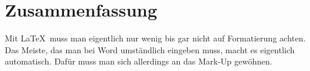 \begingroup
\color{blue}
\chapter{Zusammenfassung}
Mit \LaTeX\ muss man eigentlich nur wenig bis gar nicht auf Formatierung achten.
Das Meiste, das man bei Word umständlich eingeben muss, macht es eigentlich
automatisch. Dafür muss man sich allerdings an das Mark-Up gewöhnen.
\endgroup
